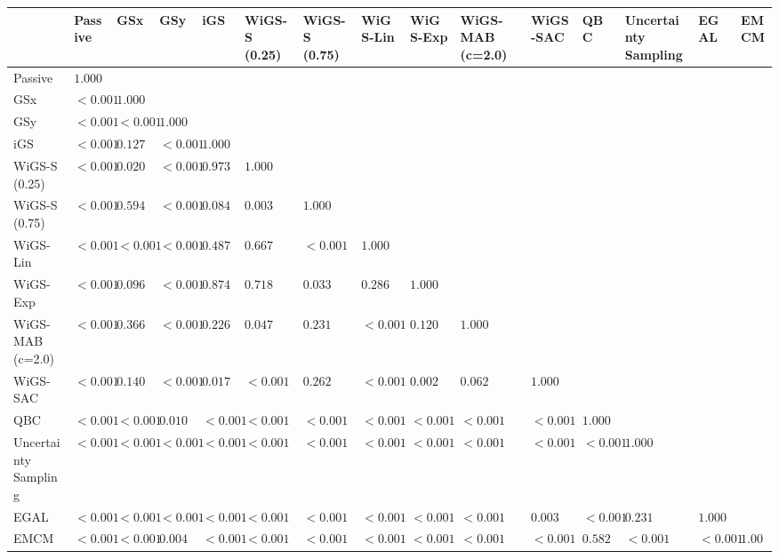 \begin{tabular}{lllllllllllllll}
\toprule
 & Passive & GSx & GSy & iGS & WiGS-S (0.25) & WiGS-S (0.75) & WiGS-Lin & WiGS-Exp & WiGS-MAB (c=2.0) & WiGS-SAC & QBC & Uncertainty Sampling & EGAL & EMCM \\
\midrule
Passive & $1.000$ &  &  &  &  &  &  &  &  &  &  &  &  &  \\
GSx & $<0.001$ & $1.000$ &  &  &  &  &  &  &  &  &  &  &  &  \\
GSy & $<0.001$ & $<0.001$ & $1.000$ &  &  &  &  &  &  &  &  &  &  &  \\
iGS & $<0.001$ & $0.127$ & $<0.001$ & $1.000$ &  &  &  &  &  &  &  &  &  &  \\
WiGS-S (0.25) & $<0.001$ & $0.020$ & $<0.001$ & $0.973$ & $1.000$ &  &  &  &  &  &  &  &  &  \\
WiGS-S (0.75) & $<0.001$ & $0.594$ & $<0.001$ & $0.084$ & $0.003$ & $1.000$ &  &  &  &  &  &  &  &  \\
WiGS-Lin & $<0.001$ & $<0.001$ & $<0.001$ & $0.487$ & $0.667$ & $<0.001$ & $1.000$ &  &  &  &  &  &  &  \\
WiGS-Exp & $<0.001$ & $0.096$ & $<0.001$ & $0.874$ & $0.718$ & $0.033$ & $0.286$ & $1.000$ &  &  &  &  &  &  \\
WiGS-MAB (c=2.0) & $<0.001$ & $0.366$ & $<0.001$ & $0.226$ & $0.047$ & $0.231$ & $<0.001$ & $0.120$ & $1.000$ &  &  &  &  &  \\
WiGS-SAC & $<0.001$ & $0.140$ & $<0.001$ & $0.017$ & $<0.001$ & $0.262$ & $<0.001$ & $0.002$ & $0.062$ & $1.000$ &  &  &  &  \\
QBC & $<0.001$ & $<0.001$ & $0.010$ & $<0.001$ & $<0.001$ & $<0.001$ & $<0.001$ & $<0.001$ & $<0.001$ & $<0.001$ & $1.000$ &  &  &  \\
Uncertainty Sampling & $<0.001$ & $<0.001$ & $<0.001$ & $<0.001$ & $<0.001$ & $<0.001$ & $<0.001$ & $<0.001$ & $<0.001$ & $<0.001$ & $<0.001$ & $1.000$ &  &  \\
EGAL & $<0.001$ & $<0.001$ & $<0.001$ & $<0.001$ & $<0.001$ & $<0.001$ & $<0.001$ & $<0.001$ & $<0.001$ & $0.003$ & $<0.001$ & $0.231$ & $1.000$ &  \\
EMCM & $<0.001$ & $<0.001$ & $0.004$ & $<0.001$ & $<0.001$ & $<0.001$ & $<0.001$ & $<0.001$ & $<0.001$ & $<0.001$ & $0.582$ & $<0.001$ & $<0.001$ & $1.000$ \\
\bottomrule
\end{tabular}
